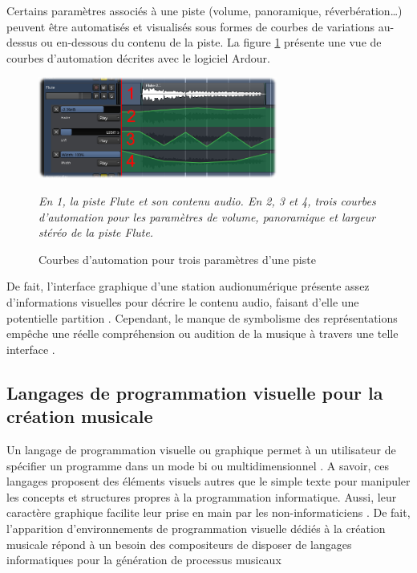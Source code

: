 Certains paramètres associés à une piste (volume, panoramique, réverbération…) peuvent être automatisés et visualisés sous formes de courbes de variations au-dessus ou en-dessous du contenu de la piste. La figure \ref{fig:exempleAutomation} présente une vue de courbes d'automation décrites avec le logiciel Ardour.

\begin{figure}[H]
	\centering
	\includegraphics[keepaspectratio=true, width=0.7\textwidth]{OutilsInformatiques/i/exempleAutomation.png}
	\caption{Courbes d'automation pour trois paramètres d'une piste}
	\label{fig:exempleAutomation}
	\small
	\it
	En 1, la piste Flute et son contenu audio. En 2, 3 et 4, trois courbes d'automation pour les paramètres de volume, panoramique et largeur stéréo de la piste Flute.					
\end{figure}

De fait, l'interface graphique d'une station audionumérique présente assez d'informations visuelles pour décrire le contenu audio, faisant d'elle une potentielle \og partition \fg.
Cependant, le manque de symbolisme des représentations empêche une réelle compréhension ou audition de la musique à travers une telle interface \cite{gottfried2017}.

\subsection{Langages de programmation visuelle pour la création musicale}
\label{subsec:programmationVisuelle}
Un langage de programmation visuelle ou graphique \og permet à un utilisateur de spécifier un programme dans un mode bi ou multidimensionnel \fg \cite{myers1989}. A savoir, ces langages proposent des éléments visuels autres que le simple texte pour manipuler les concepts et structures propres à la programmation informatique. Aussi, leur caractère graphique facilite leur prise en main par les non-informaticiens \cite{bresson2009}.
De fait, l'apparition d'environnements de programmation visuelle dédiés à la création musicale répond à un besoin des compositeurs de disposer de langages informatiques pour la génération de processus musicaux    

